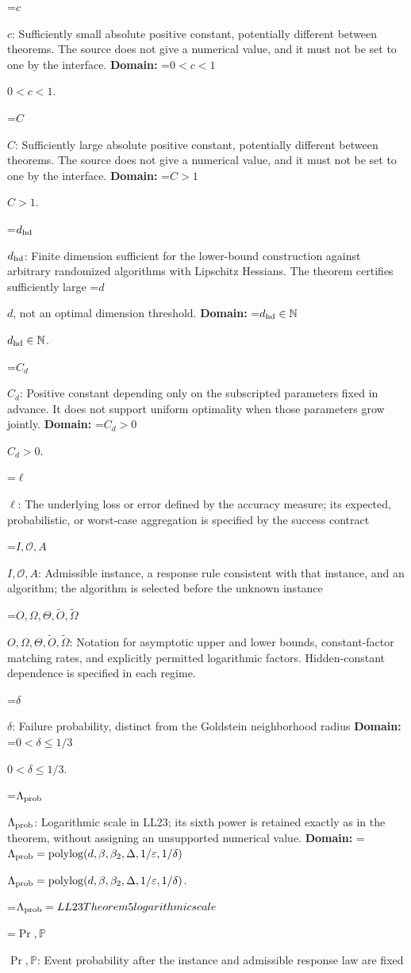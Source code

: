 \documentclass[10pt,a4paper]{article}
\newcommand{\AtlasMath}[1]{\par\begingroup\centering\setbox0=\hbox{$\displaystyle #1$}\ifdim\wd0>1.4\linewidth\typeout{ATLAS WIDE FORMULA: \the\wd0}\fi\ifdim\wd0>\linewidth\resizebox{\linewidth}{!}{\box0}\else\box0\fi\par\endgroup}
\newcommand{\AtlasInlineMath}[1]{\begingroup\setbox0=\hbox{$#1$}\ifdim\wd0>.4\linewidth\endgroup\AtlasMath{#1}\else\endgroup$#1$\fi}
\begin{document}
\AtlasInlineMath{c}: Sufficiently small absolute positive constant, potentially different between theorems. The source does not give a numerical value, and it must not be set to one by the interface. \textbf{Domain:} \AtlasInlineMath{0<c<1}.

\AtlasInlineMath{C}: Sufficiently large absolute positive constant, potentially different between theorems. The source does not give a numerical value, and it must not be set to one by the interface. \textbf{Domain:} \AtlasInlineMath{C>1}.

\AtlasInlineMath{d_{\rm hd}}: Finite dimension sufficient for the lower-bound construction against arbitrary randomized algorithms with Lipschitz Hessians. The theorem certifies sufficiently large \AtlasInlineMath{d}, not an optimal dimension threshold. \textbf{Domain:} \AtlasInlineMath{d_{\rm hd}\in\mathbb{N}}.

\AtlasInlineMath{C_d}: Positive constant depending only on the subscripted parameters fixed in advance. It does not support uniform optimality when those parameters grow jointly. \textbf{Domain:} \AtlasInlineMath{C_d>0}.

\AtlasInlineMath{\ell}: The underlying loss or error defined by the accuracy measure; its expected, probabilistic, or worst-case aggregation is specified by the success contract

\AtlasInlineMath{I,\mathcal{O},A}: Admissible instance, a response rule consistent with that instance, and an algorithm; the algorithm is selected before the unknown instance

\AtlasInlineMath{O,\Omega,\Theta,\widetilde{O},\widetilde\Omega}: Notation for asymptotic upper and lower bounds, constant-factor matching rates, and explicitly permitted logarithmic factors. Hidden-constant dependence is specified in each regime.

\AtlasInlineMath{\delta}: Failure probability, distinct from the Goldstein neighborhood radius \textbf{Domain:} \AtlasInlineMath{0<\delta\le1/3}.

\AtlasInlineMath{\Lambda_{\rm prob}}: Logarithmic scale in LL23; its sixth power is retained exactly as in the theorem, without assigning an unsupported numerical value. \textbf{Domain:} \AtlasInlineMath{\Lambda_{\rm prob}=\operatorname{polylog}(d,\beta,\beta_2,\Delta,1/\varepsilon,1/\delta)}.


\AtlasMath{\Lambda_{\rm prob}=LL23 Theorem 5 logarithmic scale}


\AtlasInlineMath{\Pr,\mathbb{P}}: Event probability after the instance and admissible response law are fixed
\end{document}
